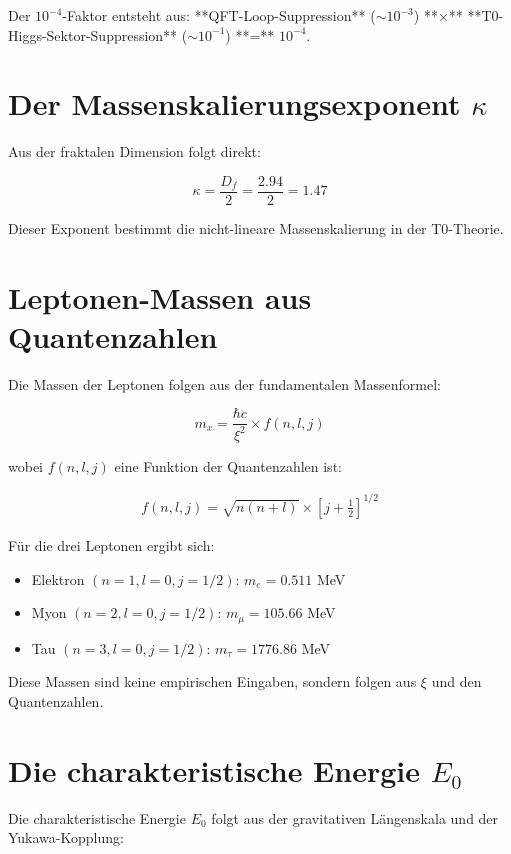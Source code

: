 \documentclass[12pt,a4paper]{article}
\begin{document}
Der $10^{-4}$-Faktor entsteht aus: **QFT-Loop-Suppression** ($\sim 10^{-3}$) **×** **T0-Higgs-Sektor-Suppression** ($\sim 10^{-1}$) **=** $10^{-4}$.
	\section{Der Massenskalierungsexponent $\kappa$}
	
	Aus der fraktalen Dimension folgt direkt:
	
	\begin{equation}
		\kappa = \frac{D_f}{2} = \frac{2.94}{2} = 1.47
	\end{equation}
	
	Dieser Exponent bestimmt die nicht-lineare Massenskalierung in der T0-Theorie.
	
	\section{Leptonen-Massen aus Quantenzahlen}
	
	Die Massen der Leptonen folgen aus der fundamentalen Massenformel:
	
	\begin{equation}
		m_x = \frac{\hbar c}{\xi^2} \times f(n, l, j)
	\end{equation}
	
	wobei $f(n, l, j)$ eine Funktion der Quantenzahlen ist:
	
	\begin{align}
		f(n, l, j) = \sqrt{n(n+l)} \times \left[j + \frac{1}{2}\right]^{1/2}
	\end{align}
	
	Für die drei Leptonen ergibt sich:
	
	\begin{itemize}
		\item Elektron $(n=1, l=0, j=1/2)$: $m_e = 0.511$ MeV
		\item Myon $(n=2, l=0, j=1/2)$: $m_\mu = 105.66$ MeV
		\item Tau $(n=3, l=0, j=1/2)$: $m_\tau = 1776.86$ MeV
	\end{itemize}
	
	Diese Massen sind keine empirischen Eingaben, sondern folgen aus $\xi$ und den Quantenzahlen.
	
	\section{Die charakteristische Energie $E_0$}
	
	Die charakteristische Energie $E_0$ folgt aus der gravitativen Längenskala und der Yukawa-Kopplung:
	
\end{document}
